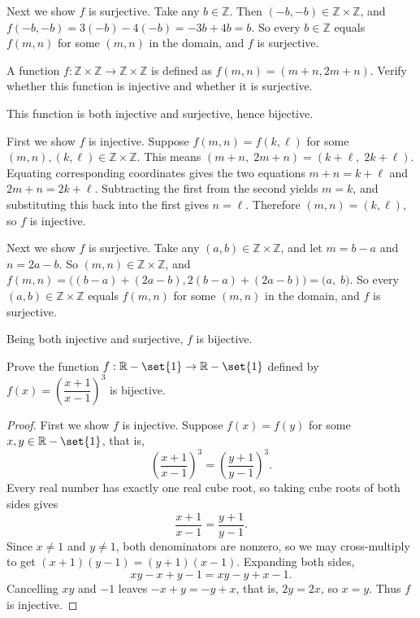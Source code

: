 \documentclass[DIN, pagenumber=false, fontsize=11pt, parskip=half]{scrartcl}
\begin{document}
\begin{problems}
    Next we show $f$ is surjective. Take any $b \in \mathbb{Z}$. Then $(-b,-b) \in \mathbb{Z} \times \mathbb{Z}$, and $f(-b,-b) = 3(-b) - 4(-b) = -3b + 4b = b$.
    So every $b \in \mathbb{Z}$ equals $f(m,n)$ for some $(m,n)$ in the domain, and $f$ is surjective.

    \problem A function $f : \mathbb{Z} \times \mathbb{Z} \to \mathbb{Z} \times \mathbb{Z}$ is defined as $f(m,n) = (m+n, 2m+n)$. Verify whether this function is injective and whether it is surjective.

    \answer This function is both injective and surjective, hence bijective.

    First we show $f$ is injective. Suppose $f(m,n) = f(k,\ell)$ for some $(m,n),(k,\ell) \in \mathbb{Z} \times \mathbb{Z}$. This means $(m+n,\; 2m+n) = (k+\ell,\; 2k+\ell)$. Equating corresponding coordinates gives the two equations $m+n = k+\ell$ and $2m+n = 2k+\ell$. Subtracting the first from the second yields $m = k$, and substituting this back into the first gives $n = \ell$. Therefore $(m,n) = (k,\ell)$, so $f$ is injective.

    Next we show $f$ is surjective. Take any $(a,b) \in \mathbb{Z} \times \mathbb{Z}$, and let $m = b-a$ and $n = 2a-b$. So $(m,n) \in \mathbb{Z} \times \mathbb{Z}$, and $f(m,n) = \big((b-a) + (2a-b), 2(b-a) + (2a-b)\big) = \big(a,\; b\big)$.
    So every $(a,b) \in \mathbb{Z} \times \mathbb{Z}$ equals $f(m,n)$ for some $(m,n)$ in the domain, and $f$ is surjective.

    Being both injective and surjective, $f$ is bijective.

    \problem Prove the function $f : \mathbb{R} - \set{1} \to \mathbb{R} - \set{1}$ defined by $f(x) = \left(\dfrac{x+1}{x-1}\right)^3$ is bijective.
    \begin{proof}
        First we show $f$ is injective. Suppose $f(x) = f(y)$ for some $x,y \in \mathbb{R} - \set{1}$, that is,
        \[
            \left(\dfrac{x+1}{x-1}\right)^3 = \left(\dfrac{y+1}{y-1}\right)^3.
        \]
        Every real number has exactly one real cube root, so taking cube roots of both sides gives
        \[
            \dfrac{x+1}{x-1} = \dfrac{y+1}{y-1}.
        \]
        Since $x \neq 1$ and $y \neq 1$, both denominators are nonzero, so we may cross-multiply to get $(x+1)(y-1) = (y+1)(x-1)$. Expanding both sides,
        \[
            xy - x + y - 1 = xy - y + x - 1.
        \]
        Cancelling $xy$ and $-1$ leaves $-x + y = -y + x$, that is, $2y = 2x$, so $x = y$. Thus $f$ is injective.


\end{proof}
\end{problems}
\end{document}
